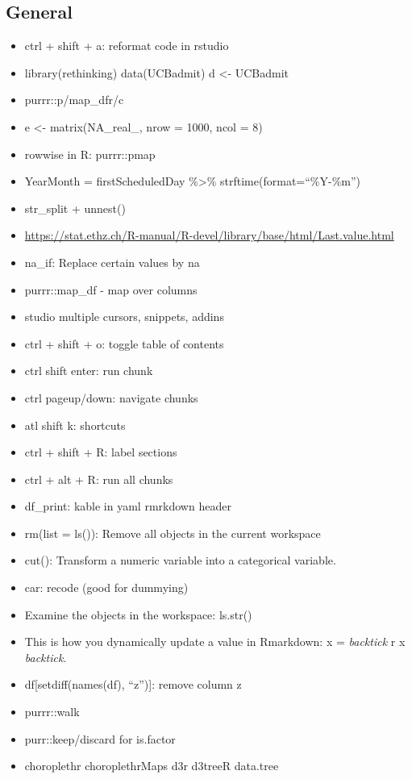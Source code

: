 \documentclass[]{book}
\theoremstyle{definition}
\theoremstyle{definition}
\theoremstyle{definition}
\theoremstyle{remark}
\begin{document}
\subsection{General}\label{general-6}

\begin{itemize}
\item
  ctrl + shift + a: reformat code in rstudio
\item
  library(rethinking) \textbar{} data(UCBadmit) \textbar{} d
  \textless{}- UCBadmit
\item
  purrr::p/map\_dfr/c
\item
  e \textless{}- matrix(NA\_real\_, nrow = 1000, ncol = 8)
\item
  rowwise in R: purrr::pmap
\item
  YearMonth = firstScheduledDay \%\textgreater{}\%
  strftime(format=``\%Y-\%m'')
\item
  str\_split + unnest()
\item
  \url{https://stat.ethz.ch/R-manual/R-devel/library/base/html/Last.value.html}
\item
  na\_if: Replace certain values by na
\item
  purrr::map\_df - map over columns
\item
  studio multiple cursors, snippets, addins
\item
  ctrl + shift + o: toggle table of contents
\item
  ctrl shift enter: run chunk
\item
  ctrl pageup/down: navigate chunks
\item
  atl shift k: shortcuts
\item
  ctrl + shift + R: label sections
\item
  ctrl + alt + R: run all chunks
\item
  df\_print: kable in yaml rmrkdown header
\item
  rm(list = ls()): Remove all objects in the current workspace
\item
  cut(): Transform a numeric variable into a categorical variable.
\item
  car: recode (good for dummying)
\item
  Examine the objects in the workspace: ls.str()
\item
  This is how you dynamically update a value in Rmarkdown: x =
  \emph{backtick} r x \emph{backtick}.
\item
  df{[}setdiff(names(df), ``z''){]}: remove column z
\item
  purrr::walk
\item
  purr::keep/discard for is.factor
\item
  choroplethr \textbar{} choroplethrMaps \textbar{}\textbar{} d3r
  \textbar{} d3treeR \textbar{} data.tree
\end{itemize}
\end{document}
